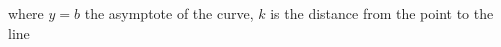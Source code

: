 \documentclass[preview]{standalone}
\begin{document}
\begin{center}
where $y=b$ the asymptote of the curve, $k$ is the distance from the point to the line
\end{center}
\end{document}

